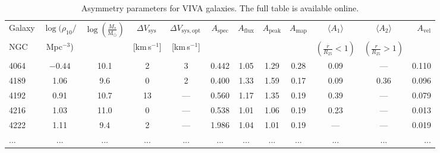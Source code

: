 \documentclass[fleqn,usenatbib]{mnras}
\begin{document}
\begin{table}
	\centering
    \caption{Asymmetry parameters for VIVA galaxies. The full table is available online.}
	\label{table:param_viva}
	\begin{tabular}{lccccccccccr}
	    \\ \hline
        Galaxy & $\log(\rho_{10}/$ & $\log\left(\frac{M_*}{\mathrm{M}_{\mathrm{\odot}}}\right)$ & $\Delta V_{\mathrm{sys}}$\, & $\Delta V_{\mathrm{sys,opt}}$\, & $A_{\mathrm{spec}}$ & $A_{\mathrm{flux}}$ & $A_{\mathrm{peak}}$ & $A_{\mathrm{map}}$ & $\langle A_{1}\rangle$ & $\langle A_{2}\rangle$ & $A_{\mathrm{vel}}$ \\
        NGC & Mpc$^{-3}$) & & [km\,s$^{-1}$] & [km\,s$^{-1}$] & & & & & $\left(\frac{r}{R_{25}}<1\right)$ & $\left(\frac{r}{R_{25}}>1\right)$ & \\ \hline
        4064 &$-0.44$ & 10.1 & 2 & 3 & 0.442 & 1.05 & 1.29 & 0.28 & 0.09 & --- & 0.110 \\ 
        4189 & 1.06 & 9.6 & 0 & 2 & 0.400 & 1.33 & 1.59 & 0.17 & 0.09 & 0.36 & 0.096 \\ 
        4192 & 0.91 & 10.7 & 13 & --- & 0.560 & 1.17 & 1.35 & 0.19 & 0.39 & --- & 0.079 \\ 
        4216 & 1.03 & 11.0 & 0 & --- & 0.538 & 1.01 & 1.06 & 0.19 & 0.23 & --- & 0.013 \\ 
        4222 & 1.11 & 9.4 & 2 & --- & 1.986 & 1.04 & 1.01 & 0.19 & --- & --- & 0.019 \\ 
        ... & ... & ... & ... & ... & ... & ... & ... & ... & ... & ... & ... \\ \hline
	\end{tabular}
\end{table}
\end{document}
